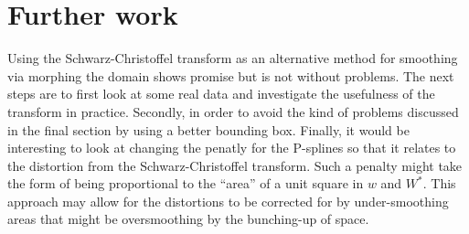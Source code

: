 \documentclass[a4paper,10pt]{amsart}
\newcommand{\sch}{Schwarz-Christoffel }
\begin{document}
\section{Further work}

Using the \sch transform as an alternative method for smoothing via morphing the domain shows promise but is not without problems. The next steps are to first look at some real data and investigate the usefulness of the transform in practice. Secondly, in order to avoid the kind of problems discussed in the final section by using a better bounding box. Finally, it would be interesting to look at changing the penatly for the P-splines so that it relates to the distortion from the \sch transform. Such a penalty might take the form of being proportional to the ``area'' of a unit square in $w$ and $W^*$. This approach may allow for the distortions to be corrected for by under-smoothing areas that might be oversmoothing by the bunching-up of space.






\end{document}
